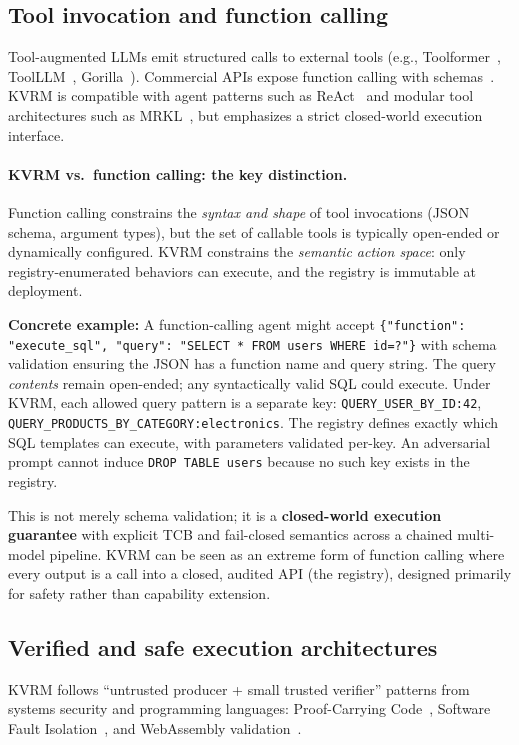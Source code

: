 \documentclass[11pt]{article}
\begin{document}
\subsection{Tool invocation and function calling}
Tool-augmented LLMs emit structured calls to external tools (e.g., Toolformer~\cite{schick2023toolformer}, ToolLLM~\cite{qin2023toollm}, Gorilla~\cite{patil2023gorilla}). Commercial APIs expose function calling with schemas~\cite{openai2023functioncalling}.
KVRM is compatible with agent patterns such as ReAct~\cite{yao2022react} and modular tool architectures such as MRKL~\cite{karpas2022mrkl}, but emphasizes a strict closed-world execution interface.

\paragraph{KVRM vs.\ function calling: the key distinction.}
Function calling constrains the \emph{syntax and shape} of tool invocations (JSON schema, argument types), but the set of callable tools is typically open-ended or dynamically configured.
KVRM constrains the \emph{semantic action space}: only registry-enumerated behaviors can execute, and the registry is immutable at deployment.

\textbf{Concrete example:} A function-calling agent might accept \texttt{\{"function": "execute\_sql", "query": "SELECT * FROM users WHERE id=?"\}} with schema validation ensuring the JSON has a function name and query string. The query \emph{contents} remain open-ended; any syntactically valid SQL could execute.
Under KVRM, each allowed query pattern is a separate key: \texttt{QUERY\_USER\_BY\_ID:42}, \texttt{QUERY\_PRODUCTS\_BY\_CATEGORY:electronics}. The registry defines exactly which SQL templates can execute, with parameters validated per-key. An adversarial prompt cannot induce \texttt{DROP TABLE users} because no such key exists in the registry.

This is not merely schema validation; it is a \textbf{closed-world execution guarantee} with explicit TCB and fail-closed semantics across a chained multi-model pipeline.
KVRM can be seen as an extreme form of function calling where every output is a call into a closed, audited API (the registry), designed primarily for safety rather than capability extension.

\subsection{Verified and safe execution architectures}
KVRM follows ``untrusted producer + small trusted verifier'' patterns from systems security and programming languages:
Proof-Carrying Code~\cite{necula1997pcc}, Software Fault Isolation~\cite{wahbe1993sfi}, and WebAssembly validation~\cite{haas2017wasm,watt2018wasm}.
\end{document}
